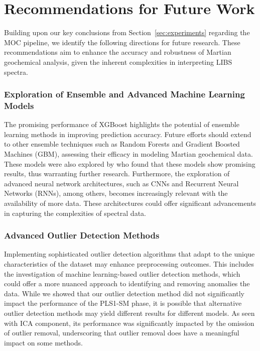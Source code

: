 \section{Recommendations for Future Work}\label{sec:recommendations_for_future_work}
Building upon our key conclusions from Section~\ref{sec:experiments} regarding the MOC pipeline, we identify the following directions for future research.
These recommendations aim to enhance the accuracy and robustness of Martian geochemical analysis, given the inherent complexities in interpreting LIBS spectra.

\subsubsection*{Exploration of Ensemble and Advanced Machine Learning Models} The promising performance of XGBoost highlights the potential of ensemble learning methods in improving prediction accuracy. 
Future efforts should extend to other ensemble techniques such as Random Forests and Gradient Boosted Machines (GBM), assessing their efficacy in modeling Martian geochemical data.
These models were also explored by \citet{andersonPostlandingMajorElement2022} who found that these models show promising results, thus warranting further research.
Furthermore, the exploration of advanced neural network architectures, such as CNNs and Recurrent Neural Networks (RNNs), among others, becomes increasingly relevant with the availability of more data.
These architectures could offer significant advancements in capturing the complexities of spectral data.

\subsubsection*{Advanced Outlier Detection Methods} Implementing sophisticated outlier detection algorithms that adapt to the unique characteristics of the dataset may enhance preprocessing outcomes.
This includes the investigation of machine learning-based outlier detection methods, which could offer a more nuanced approach to identifying and removing anomalies the data.
While we showed that our outlier detection method did not significantly impact the performance of the PLS1-SM phase, it is possible that alternative outlier detection methods may yield different results for different models.
As seen with ICA component, its performance was significantly impacted by the omission of outlier removal, underscoring that outlier removal does have a meaningful impact on some methods.

